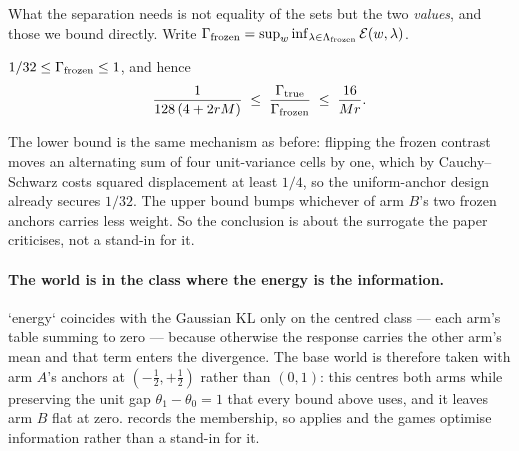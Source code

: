 What the separation needs is not equality of the sets but the two \emph{values}, and those
we bound directly. Write $\Gamma_{\rm frozen}=\sup_{w}\inf_{\lambda\in\Lambda_{\rm
frozen}}\mathcal{E}(w,\lambda)$.

\begin{theorem}
\label{thm:frozengames}
$1/32\le\Gamma_{\rm frozen}\le1$, and hence
\[
\frac{1}{128\,(4+2rM)}\;\le\;\frac{\Gamma_{\rm true}}{\Gamma_{\rm frozen}}\;\le\;
\frac{16}{Mr}.
\]
\end{theorem}

The lower bound is the same mechanism as before: flipping the frozen contrast moves an
alternating sum of four unit-variance cells by one, which by Cauchy--Schwarz costs squared
displacement at least $1/4$, so the uniform-anchor design already secures $1/32$. The
upper bound bumps whichever of arm $B$'s two frozen anchors carries less weight. So the
conclusion is about the surrogate the paper criticises, not a stand-in for it.


\paragraph{The world is in the class where the energy is the information.}
`energy` coincides with the Gaussian KL only on the centred class --- each arm's table
summing to zero --- because otherwise the response carries the other arm's mean and that
term enters the divergence. The base world is therefore taken with arm $A$'s anchors at
$(-\tfrac12,+\tfrac12)$ rather than $(0,1)$: this centres both arms while preserving the
unit gap $\theta_{1}-\theta_{0}=1$ that every bound above uses, and it leaves arm $B$ flat
at zero.  records the membership, so
 applies and the games optimise information rather
than a stand-in for it.



